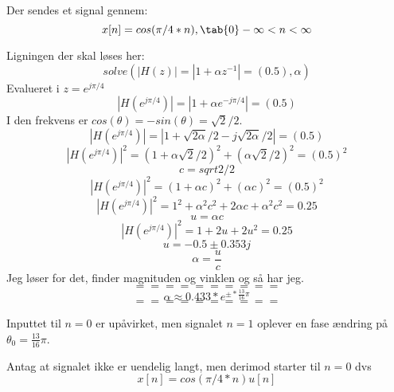 \begin{rubrik}
\begin{eksamensOpgave}
        Der sendes et signal gennem: 
        \[x[n] = cos(\pi/4 * n), \tab{0} -\infty < n < \infty\]
        \begin{UnderOpgave}
            Ligningen der skal løses her: 
            \[solve(|H(z)| = |1 + \alpha z^{-1}| = (0.5), \alpha)\]
            Evalueret i $z = e^{j\pi/4}$
            \[|H(e^{j\pi/4})| = |1 + \alpha e^{-j\pi/4}| = (0.5)\]
            I den frekvens er $cos(\theta) = -sin(\theta) = \sqrt{2}/2$. 
            \[|H(e^{j\pi/4})| = |1 + \sqrt{2\alpha}/2 - j\sqrt{2\alpha}/2| = (0.5)\]
            \[|H(e^{j\pi/4})|^2 = (1 + \alpha\sqrt{2}/2)^2 + (\alpha\sqrt{2}/2)^2 = (0.5)^2\]
            \[c = sqrt{2}/2\]
            \[|H(e^{j\pi/4})|^2 = (1 + \alpha c)^2 + (\alpha c)^2 = (0.5)^2\]
            \[|H(e^{j\pi/4})|^2 = 1^2 + \alpha^2c^2 + 2\alpha c + \alpha^2c^2 = 0.25\]
            \[u = \alpha c\]
            \[|H(e^{j\pi/4})|^2 = 1 + 2u + 2u^2 = 0.25\]
            \[u = -0.5 \pm 0.353j\]
            \[\alpha = \frac{u}{c}\]
            Jeg løser for det, finder magnituden og vinklen og så har jeg.
            \[==========\] 
            \[\alpha \approx 0.433*e^{\pm * \frac{13}{16} \pi}\]
            \[==========\]
        \end{UnderOpgave}
        \begin{UnderOpgave}
            Inputtet til $n = 0$ er upåvirket, men signalet $n = 1$ oplever en fase ændring på $\theta_0 = \frac{13}{16}\pi$.                       
        \end{UnderOpgave}
        Antag at signalet ikke er uendelig langt, men derimod starter til $n = 0$ dvs
        \[x[n] = cos(\pi/4 * n)u[n]\]
        

\end{eksamensOpgave}
\end{rubrik}
